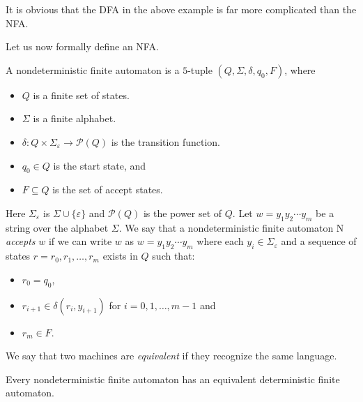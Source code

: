 It is obvious that the DFA in the above example is far more complicated than the NFA.

Let us now formally define an NFA.
\begin{definition}
A nondeterministic finite automaton is a $5$-tuple $(Q,\Sigma,\delta,q_0,F)$, where
\begin{itemize}
    \item $Q$ is a finite set of states.
    \item $\Sigma$ is a finite alphabet.
    \item $\delta:Q\times\Sigma_\varepsilon\to\mathcal{P}(Q)$ is the transition function.
    \item $q_0\in Q$ is the start state, and
    \item $F\subseteq Q$ is the set of accept states.
\end{itemize}
\end{definition}

Here $\Sigma_\varepsilon$ is $\Sigma\cup\{\varepsilon\}$ and $\mathcal{P}(Q)$ is the power set of $Q$.
\vspace{3mm}
Let $w=y_1y_2\cdots y_m$ be a string over the alphabet $\Sigma$. We say that a nondeterministic finite automaton N \textit{accepts} $w$ if we can write $w$ as $w=y_1y_2\cdots y_m$ where each $y_i\in\Sigma_\varepsilon$ and a sequence of states $r=r_0,r_1,\ldots,r_m$ exists in $Q$ such that:
\begin{itemize}
    \item $r_0=q_0$,
    \item $r_{i+1}\in\delta(r_i, y_{i+1})$ for $i=0,1,\ldots,m-1$ and
    \item $r_m\in F$.
\end{itemize}

\begin{definition}
We say that two machines are \textit{equivalent} if they recognize the same language.
\end{definition}
\begin{theorem}
Every nondeterministic finite automaton has an equivalent deterministic finite automaton.
\end{theorem}

